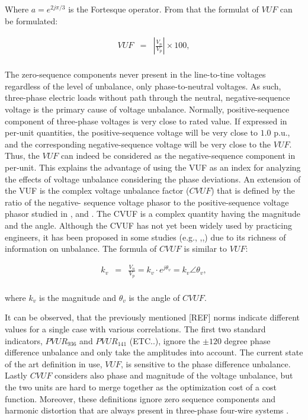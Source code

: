 	Where $a=e^{2j\pi/3}$ is the Fortesque operator. From that the formulat of $VUF$ can be formulated:
	
	
	\begin{equation}
        \begin{array}{rcl}
            VUF&=&\left|\frac{V_n}{V_p}\right|\times100,\\					
        \end{array}
        \label{BASICUNB:equ:VUF}
    \end{equation}
	
	
	The zero-sequence components never present in the line-to-tine voltages regardless of the level of unbalance, only phase-to-neutral voltages. As such, three-phase electric loads without path through the neutral, negative-sequence voltage is the primary cause of voltage unbalance. Normally, positive-sequence component of three-phase voltages is very close to rated value. If expressed in per-unit quantities, the positive-sequence voltage will be very close to $1.0$ p.u., and the corresponding negative-sequence voltage will be very close to the $VUF$. Thus, the $VUF$ can indeed be considered as the negative-sequence component in per-unit.	This explains the advantage of using the VUF as an index for analyzing the effects of voltage unbalance considering the phase deviations.
	An extension of the VUF is the complex voltage unbalance factor ($CVUF$) that is defined by the ratio of the negative-
sequence voltage phasor to the positive-sequence voltage phasor studied in \cite{wang2000analytical}, and \cite{pierrat1987unbalance}. The CVUF is a complex quantity having the magnitude and the angle. Although the CVUF has not yet been widely used by practicing engineers, it has been proposed in some studies (e.g., \cite{wang2001analysis},\cite{singh2007some},\cite{chen2013examination}) due to its richness of information on unbalance. The formula of $CVUF$ is similar to $VUF$:

\begin{equation}
        \begin{array}{rcl}
            k_v&=&\frac{V_n}{V_p}=k_v\cdot e^{j\theta_v}=k_v\angle\theta_v,\\					
        \end{array}
        \label{BASICUNB:equ:CVUF}
    \end{equation}
		
		where $k_v$ is the magnitude and $\theta_v$ is the angle of $CVUF$.
		
			It can be observed, that the previously mentioned [REF] norms indicate different values for a single case with various correlations. The first two standard indicators, $PVUR_{936}$ and $PVUR_{141}$ (ETC..), ignore the $\pm120$ degree phase difference unbalance and only take the amplitudes into account. The current state of the art definition in use, $VUF$, is sensitive to the phase difference unbalance. Lastly $CVUF$ considers also phase and magnitude of the voltage unbalance, but the two units are hard to merge together as the optimization cost of a cost function. Moreover, these definitions ignore zero sequence components and harmonic distortion that are always present in three-phase four-wire systems \cite{bina2011three}.
		          
